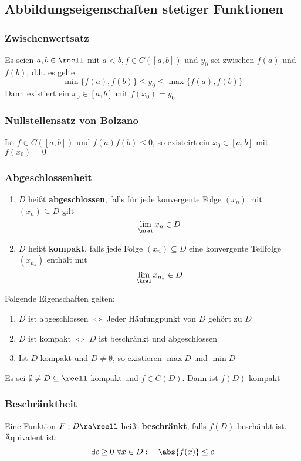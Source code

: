 \documentclass{kit}
\begin{document}
  \subsection{Abbildungseigenschaften stetiger Funktionen}
    \subsubsection{Zwischenwertsatz}
      Es seien $a,b\in\reell$ mit $a<b,f\in C([a,b])$ und $y_0$ sei zwischen $f(a)$ und $f(b)$, d.h. es gelte
      $$\min\{f(a),f(b)\}\le y_0\le\max\{f(a),f(b)\}$$
      Dann existiert ein $x_0\in[a,b]$ mit $f(x_0)=y_0$
    \subsubsection{Nullstellensatz von Bolzano}
      Ist $f\in C([a,b])$ und $f(a)f(b)\le0$, so existeirt ein $x_0\in[a,b]$ mit $f(x_0)=0$
    \subsubsection{Abgeschlossenheit}
      \begin{enumerate}
        \item $D$ heißt \textbf{abgeschlossen}, falls für jede konvergente Folge $(x_n)$ mit $(x_n)\subseteq D$ gilt
          $$\lim_\nrai x_n\in D$$
      \item $D$ heißt \textbf{kompakt}, falls jede Folge $(x_n)\subseteq D$ eine konvergente Teilfolge $(x_{n_k})$ enthält mit
          $$\lim_\krai x_{n_k}\in D$$
      \end{enumerate}
      Folgende Eigenschaften gelten:
      \begin{enumerate}
        \item $D$ ist abgeschlossen $\Longleftrightarrow$ Jeder Häufungpunkt von $D$ gehört zu $D$
        \item $D$ ist kompakt $\Longleftrightarrow$ $D$ ist beschränkt und abgeschlossen
        \item Ist $D$ kompakt und $D\neq\emptyset$, so existieren $\max D$ und $\min D$
      \end{enumerate}
      Es sei $\emptyset\neq D\subseteq\reell$ kompakt und $f\in C(D)$. Dann ist $f(D)$ kompakt
    \subsubsection{Beschränktheit}
      Eine Funktion $F:D\ra\reell$ heißt \textbf{beschränkt}, falls $f(D)$ beschänkt ist.\\
      Äquivalent ist:
      $$\exists c\ge0\ \forall x\in D:\quad\abs{f(x)}\le c$$
\end{document}

